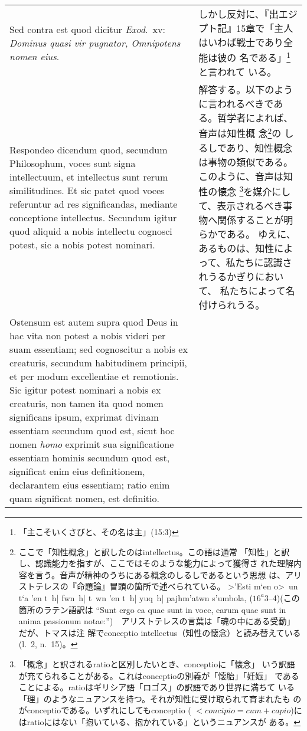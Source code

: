 \documentclass[10pt]{jsarticle}
\begin{document}
\begin{longtable}{p{21em}p{21em}}
\\

{\sc Sed contra est} quod dicitur {\it Exod}.\ {\sc xv}: {\it Dominus
quasi vir pugnator, Omnipotens nomen eius}.

&

しかし反対に、『出エジプト記』15章で「主人はいわば戦士であり全能は彼の
名である」\footnote{「主こそいくさびと、その名は主」(15:3)}と言われて
いる。

\\

{\sc Respondeo dicendum} quod, secundum Philosophum, voces sunt signa
intellectuum, et intellectus sunt rerum similitudines. Et sic patet
quod voces referuntur ad res significandas, mediante conceptione
intellectus. Secundum igitur quod aliquid a nobis intellectu cognosci
potest, sic a nobis potest nominari.

&

解答する。以下のように言われるべきである。哲学者によれば、音声は知性概
念\footnote{ここで「知性概念」と訳したのはintellectus。この語は通常
「知性」と訳し、認識能力を指すが、ここではそのような能力によって獲得さ
れた理解内容を言う。音声が精神のうちにある概念のしるしであるという思想
は、アリストテレスの『命題論』冒頭の箇所で述べられている。
\foreignlanguage{greek}{>'Esti m`en o>~un t`a 'en t~h| fwn~h| t~wn 'en
t~h| yuq~h| pajhm'atwn s'umbola,} ($16^{a}3$--4)(この箇所のラテン語訳は
``Sunt ergo ea quae sunt in voce, earum quae sunt in anima passionum
notae:'')　アリストテレスの言葉は「魂の中にある受動」だが、トマスは注
解でconceptio intellectus（知性の懐念）と読み替えている(l.~2, n.~15)。}の
しるしであり、知性概念は事物の類似である。このように、音声は知性の懐念
\footnote{「概念」と訳されるratioと区別したいとき、conceptioに「懐念」
いう訳語が充てられることがある。これはconceptioの別義が「懐胎」「妊娠」
であることによる。ratioはギリシア語「ロゴス」の訳語であり世界に満ちて
いる「理」のようなニュアンスを持つ。それが知性に受け取られて育まれたも
のがconceptioである。いずれにしてもconceptio ( $< concipio = cum +
capio$)にはratioにはない「抱いている、抱かれている」というニュアンスが
ある。}を媒介にして、表示されるべき事物へ関係することが明らかである。
ゆえに、あるものは、知性によって、私たちに認識されうるかぎりにおいて、
私たちによって名付けられうる。

\\

Ostensum est autem supra quod Deus in hac vita non potest a nobis
videri per suam essentiam; sed cognoscitur a nobis ex creaturis,
secundum habitudinem principii, et per modum excellentiae et
remotionis. Sic igitur potest nominari a nobis ex creaturis, non tamen
ita quod nomen significans ipsum, exprimat divinam essentiam secundum
quod est, sicut hoc nomen {\it homo} exprimit sua significatione
essentiam hominis secundum quod est, significat enim eius
definitionem, declarantem eius essentiam; ratio enim quam significat
nomen, est definitio.


\end{longtable}
\end{document}
